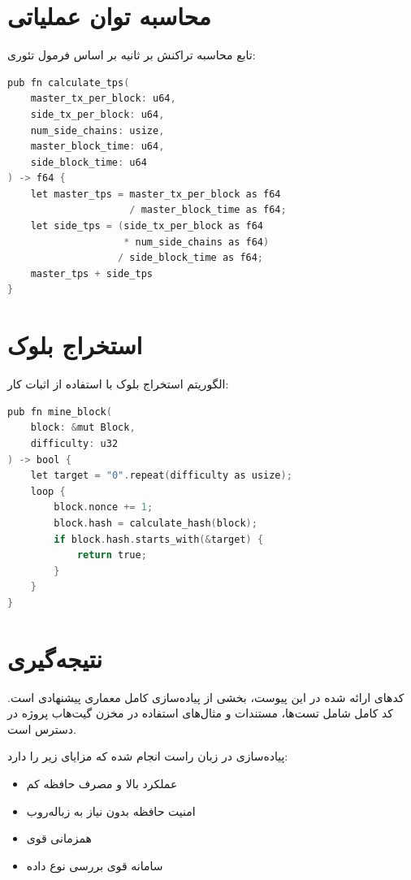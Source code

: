 \section{محاسبه توان عملیاتی}

تابع محاسبه تراکنش بر ثانیه بر اساس فرمول تئوری:

\singlespacing
\begin{LTR}
\begin{lstlisting}[language=C, caption={محاسبه توان عملیاتی}, label={code:tps_calculation}]
pub fn calculate_tps(
    master_tx_per_block: u64,
    side_tx_per_block: u64,
    num_side_chains: usize,
    master_block_time: u64,
    side_block_time: u64
) -> f64 {
    let master_tps = master_tx_per_block as f64 
                     / master_block_time as f64;
    let side_tps = (side_tx_per_block as f64 
                    * num_side_chains as f64) 
                   / side_block_time as f64;
    master_tps + side_tps
}
\end{lstlisting}
\end{LTR}
\doublespacing

\section{استخراج بلوک}

الگوریتم استخراج بلوک با استفاده از اثبات کار:

\singlespacing
\begin{LTR}
\begin{lstlisting}[language=C, caption={استخراج بلوک}, label={code:mining}]
pub fn mine_block(
    block: &mut Block,
    difficulty: u32
) -> bool {
    let target = "0".repeat(difficulty as usize);
    loop {
        block.nonce += 1;
        block.hash = calculate_hash(block);
        if block.hash.starts_with(&target) {
            return true;
        }
    }
}
\end{lstlisting}
\end{LTR}
\doublespacing

\section{نتیجه‌گیری}

کدهای ارائه شده در این پیوست، بخشی از پیاده‌سازی کامل معماری پیشنهادی است. کد کامل شامل تست‌ها، مستندات و مثال‌های استفاده در مخزن گیت‌هاب پروژه در دسترس است.

پیاده‌سازی در زبان راست انجام شده که مزایای زیر را دارد:
\begin{itemize}
    \item عملکرد بالا و مصرف حافظه کم
    \item امنیت حافظه بدون نیاز به زباله‌روب
    \item همزمانی قوی
    \item سامانه قوی بررسی نوع داده
\end{itemize}
